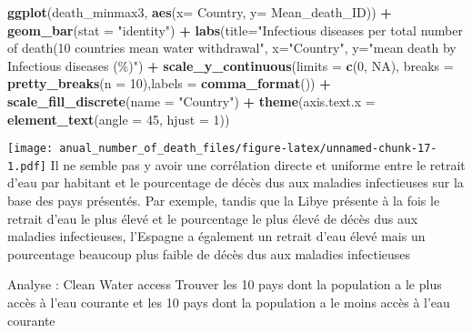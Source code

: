 \documentclass[
]{article}
\newenvironment{Shaded}{\begin{snugshade}}{\end{snugshade}}
\newcommand{\AttributeTok}[1]{\textcolor[rgb]{0.13,0.29,0.53}{#1}}
\newcommand{\ConstantTok}[1]{\textcolor[rgb]{0.56,0.35,0.01}{#1}}
\newcommand{\DecValTok}[1]{\textcolor[rgb]{0.00,0.00,0.81}{#1}}
\newcommand{\FunctionTok}[1]{\textcolor[rgb]{0.13,0.29,0.53}{\textbf{#1}}}
\newcommand{\NormalTok}[1]{#1}
\newcommand{\SpecialCharTok}[1]{\textcolor[rgb]{0.81,0.36,0.00}{\textbf{#1}}}
\newcommand{\StringTok}[1]{\textcolor[rgb]{0.31,0.60,0.02}{#1}}
\begin{document}
\begin{Shaded}
\begin{Highlighting}[]
\FunctionTok{ggplot}\NormalTok{(death\_minmax3, }\FunctionTok{aes}\NormalTok{(}\AttributeTok{x=}\NormalTok{ Country, }\AttributeTok{y=} \StringTok{\textasciigrave{}}\AttributeTok{Mean\_death\_ID}\StringTok{\textasciigrave{}}\NormalTok{)) }\SpecialCharTok{+} \FunctionTok{geom\_bar}\NormalTok{(}\AttributeTok{stat =} \StringTok{"identity"}\NormalTok{) }\SpecialCharTok{+} \FunctionTok{labs}\NormalTok{(}\AttributeTok{title=}\StringTok{"Infectious diseases per total number of death(10 countries mean water withdrawal"}\NormalTok{, }\AttributeTok{x=}\StringTok{"Country"}\NormalTok{, }\AttributeTok{y=}\StringTok{"mean death by Infectious diseases (\%)"}\NormalTok{) }\SpecialCharTok{+}  \FunctionTok{scale\_y\_continuous}\NormalTok{(}\AttributeTok{limits =} \FunctionTok{c}\NormalTok{(}\DecValTok{0}\NormalTok{, }\ConstantTok{NA}\NormalTok{), }\AttributeTok{breaks =} \FunctionTok{pretty\_breaks}\NormalTok{(}\AttributeTok{n =} \DecValTok{10}\NormalTok{),}\AttributeTok{labels =} \FunctionTok{comma\_format}\NormalTok{()) }\SpecialCharTok{+} \FunctionTok{scale\_fill\_discrete}\NormalTok{(}\AttributeTok{name =} \StringTok{"Country"}\NormalTok{) }\SpecialCharTok{+} 
  \FunctionTok{theme}\NormalTok{(}\AttributeTok{axis.text.x =} \FunctionTok{element\_text}\NormalTok{(}\AttributeTok{angle =} \DecValTok{45}\NormalTok{, }\AttributeTok{hjust =} \DecValTok{1}\NormalTok{))}
\end{Highlighting}
\end{Shaded}

\texttt{[image: anual\_number\_of\_death\_files/figure-latex/unnamed-chunk-17-1.pdf]}
Il ne semble pas y avoir une corrélation directe et uniforme entre le
retrait d'eau par habitant et le pourcentage de décès dus aux maladies
infectieuses sur la base des pays présentés. Par exemple, tandis que la
Libye présente à la fois le retrait d'eau le plus élevé et le
pourcentage le plus élevé de décès dus aux maladies infectieuses,
l'Espagne a également un retrait d'eau élevé mais un pourcentage
beaucoup plus faible de décès dus aux maladies infectieuses

Analyse : Clean Water access Trouver les 10 pays dont la population a le
plus accès à l'eau courante et les 10 pays dont la population a le moins
accès à l'eau courante
\end{document}
